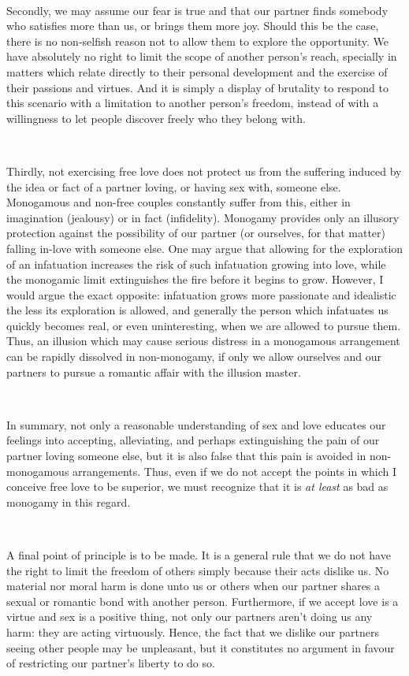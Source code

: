 \documentclass[a4paper, 12pt]{article}
\begin{document}
~ 

Secondly, we may assume our fear is true and that our partner finds somebody
who satisfies more than us, or brings them more joy. Should this be the case,
there is no non-selfish reason not to allow them to explore the opportunity. We
have absolutely no right to limit the scope of another person's reach,
specially in matters which relate directly to their personal development and
the exercise of their passions and virtues. And it is simply a display of
brutality to respond to this scenario with a limitation to another person's
freedom, instead of with a willingness to let people discover freely who they
belong with.

~

Thirdly, not exercising free love does not protect us from the suffering induced 
by the idea or fact of a partner loving, or having sex with, someone else.
Monogamous and non-free couples constantly suffer from this, either in imagination
(jealousy) or in fact (infidelity). Monogamy provides only an illusory
protection against the possibility of our partner (or ourselves, for that
matter) falling in-love with someone else. One may argue that allowing for the
exploration of an infatuation increases the risk of such infatuation growing
into love, while the monogamic limit extinguishes the fire before it begins to
grow. However, I would argue the exact opposite: infatuation grows more
passionate and idealistic the less its exploration is allowed, and generally
the person which infatuates us quickly becomes real, or even
uninteresting, when we are allowed to pursue them. Thus, an illusion which may
cause serious distress in a monogamous arrangement can be rapidly dissolved in
non-monogamy, if only we allow ourselves and our partners to pursue a romantic
affair with the illusion master.

~

In summary, not only a reasonable understanding of sex and love educates our
feelings into accepting, alleviating, and perhaps extinguishing the pain of our
partner loving someone else, but it is also false that this pain is avoided in
non-monogamous arrangements. Thus, even if we do not accept the points in which
I conceive free love to be superior, we must recognize that it is \textit{at
least} as bad as monogamy in this regard.

~

A final point of principle is to be made. It is a general rule that we do not
have the right to limit the freedom of others simply because their acts dislike
us. No material nor moral harm is done unto us or others when our partner
shares a sexual or romantic bond with another person. Furthermore, if we accept
love is a virtue and sex is a positive thing, not only our partners aren't
doing us any harm: they are acting virtuously. Hence, the fact that we dislike
our partners seeing other people may be unpleasant, but it constitutes no
argument in favour of restricting our partner's liberty to do so. 
\end{document}
